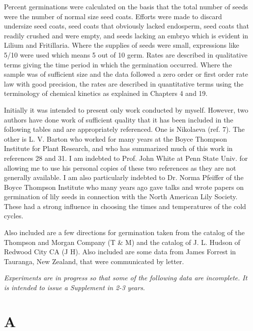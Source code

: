Percent germinations were calculated on the basis that the total number of
seeds were the number of normal size seed coats. Efforts were made to discard
undersize seed coats, seed coats that obviously lacked endosperm, seed coats that
readily crushed and were empty, and seeds lacking an embryo which is evident in
Lilium and Fritillaria. Where the supplies of seeds were small, expressions like 5/10
were used which means 5 out of 10 germ. Rates are described in qualitative terms
giving the time period in which the germination occurred. Where the sample was of
sufficient size and the data followed a zero order or first order rate law with good
precision, the rates are described in quantitative terms using the terminology of
chemical kinetics as explained in Chapters 4 and 19.

Initially it was intended to present only work conducted by myself. However, two
authors have done work of sufficient quality that it has been included in the following
tables and are appropriately referenced. One is Nikolaeva (ref. 7). The other is L. V.
Barton who worked for many years at the Boyce Thompson Institute for Plant
Research, and who has summarized much of this work in references 28 and 31. I am
indebted to Prof. John White at Penn State Univ. for allowing me to use his personal
copies of these two references as they are not generally available. I am also
particularly indebted to Dr. Norma Pfeiffer of the Boyce Thompson Institute who many
years ago gave talks and wrote papers on germination of lily seeds in connection with
the North American Lily Society. These had a strong influence in choosing the times
and temperatures of the cold cycles.

Also included are a few directions for germination taken from the catalog of the
Thompson and Morgan Company (T \& M) and the catalog of J. L. Hudson of Redwood
City CA (J H). Also included are some data from James Forrest in Tauranga, New
Zealand, that were communicated by letter.

\textit{Experiments are in progress so that some of the following data are incomplete.
It is intended to issue a Supplement in 2-3 years.}

\section{A}

